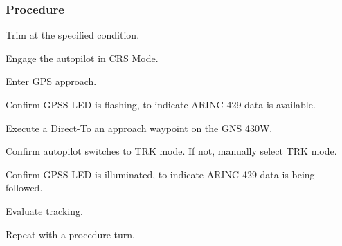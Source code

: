 \subsubsection*{Procedure}
 \begin{compactenum}
    \item Trim at the specified condition.
    \item Engage the autopilot in CRS Mode.
    \item Enter GPS approach.
    \item Confirm GPSS LED is flashing, to indicate ARINC 429 data is available.
    \item Execute a Direct-To an approach waypoint on the GNS 430W.
    \item Confirm autopilot switches to TRK mode.  If not, manually select TRK mode.
    \item Confirm GPSS LED is illuminated, to indicate ARINC 429 data is being followed.
    \item Evaluate tracking.
    \item Repeat with a procedure turn.
    \end{compactenum}
